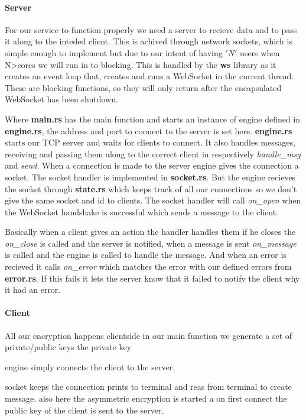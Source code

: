 \paragraph{Server}

For our service to function properly we need a server to recieve data
and to pass it along to the inteded client. This is achived through
network sockets, which is simple enough to implement but due to our
intent of having $'N'$ users when N>cores we will run in to blocking.
This is handled by the \textbf{ws} library as it creates an event loop
that, creates and runs a WebSocket in the current thread. These are
blocking functions, so they will only return after the encapsulated
WebSocket has been shutdown.

Where \textbf{main.rs} has the main function and starts an instance of
engine defined in \textbf{engine.rs}, the address and port to connect
to the server is set here. \textbf{engine.rs} starts our TCP server
and waits for clients to connect. It also handles messages, receiving
and passing them along to the correct client in respectively
\emph{handle\_msg} and \emph{send}. When a connection is made to the
server engine gives the connection a socket. The socket handler is
implemented in \textbf{socket.rs}. But the engine recieves the socket
through \textbf{state.rs} which keeps track of all our connections so
we don't give the same socket and id to clients. The socket handler
will call \emph{on\_open} when the WebSocket handshake is successful
which sends a message to the client.

Basically when a client gives an action the handler handles them if he
closes the \emph{on\_close} is called and the server is notified, when
a message is sent \emph{on\_message} is called and the engine is
called to handle the message. And when an error is recieved it calls
\emph{on\_error} which matches the error with our defined errors from
\textbf{error.rs}. If this fails it lets the server know that it
failed to notify the client why it had an error.

\paragraph{Client}
All our encryption happens clientside in our main function we generate
a set of private/public keys the private key


engine simply connects the client to the server.

socket keeps the connection prints to terminal and reas from terminal
to create message. also here the asymmetric encryption is started a on
first connect the public key of the client is sent to the server.






